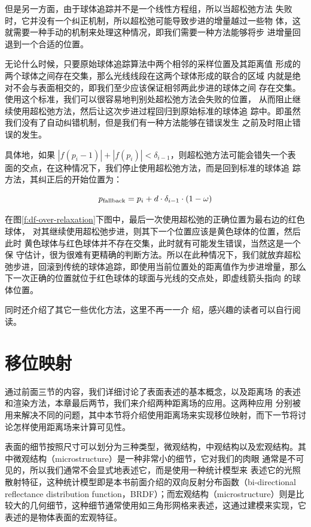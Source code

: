 但是另一方面，由于球体追踪并不是一个线性方程组，所以当超松弛方法 失败时，它并没有一个纠正机制，所以超松弛可能导致步进的增量越过一些物 体，这就需要一种手动的机制来处理这种情况，即我们需要一种方法能够将步 进增量回退到一个合适的位置。

无论什么时候，只要原始球体追踪算法中两个相邻的采样位置及其距离值 形成的两个球体之间存在交集，那么光线线段在这两个球体形成的联合的区域 内就是绝对不会与表面相交的，即我们至少应该保证相邻两此步进的球体之间 存在交集。使用这个标准，我们可以很容易地判别处超松弛方法会失败的位置， 从而阻止继续使用超松弛方法，然后让这次步进过程回归到原始标准的球体追 踪中。即虽然我们没有了自动纠错机制，但是我们有一种方法能够在错误发生 之前及时阻止错误的发生。

具体地，如果 $|f(p_i−1)| + |f(p_i)|< \delta_{i−1}$，则超松弛方法可能会错失一个表 面的交点，在这种情况下，我们停止使用超松弛方法，而是回到标准的球体追 踪方法，其纠正后的开始位置为：

\begin{equation}
	p_{\rm fallback}=p_i+d\cdot \delta_{i-1}\cdot (1-\omega)
\end{equation}

在图\ref{f:df-over-relaxation}下图中，最后一次使用超松弛的正确位置为最右边的红色球体， 对其继续使用超松弛步进，则其下一个位置应该是黄色球体的位置，然后此时 黄色球体与红色球体并不存在交集，此时就有可能发生错误，当然这是一个保 守估计，很为很难有更精确的判断方法。所以在此种情况下，我们就放弃超松 弛步进，回滚到传统的球体追踪，即使用当前位置处的距离值作为步进增量，那么下一次正确的位置就位于红色球体的球面与光线的交点处，即虚线箭头指向 的球体位置。

\cite{a:Enhanced-Sphere-Tracing}同时还介绍了其它一些优化方法，这里不再一一介 绍，感兴趣的读者可以自行阅读。




\section{移位映射}
通过前面三节的内容，我们详细讨论了表面表述的基本概念，以及距离场 的表述和渲染方法，本章最后两节，我们来介绍两种距离场的应用。这两种应用 分别被用来解决不同的问题，其中本节将介绍使用距离场来实现移位映射，而下一节将讨论怎样使用距离场来计算可见性。

表面的细节按照尺寸可以划分为三种类型，微观结构，中观结构以及宏观结构。其中微观结构（microstructure）是一种非常小的细节，它对我们的肉眼 通常是不可见的，所以我们通常不会显式地表述它，而是使用一种统计模型来 表述它的光照散射特征，这种统计模型即是本书前面介绍的双向反射分布函数（bi-directional reflectance distribution function，BRDF）；而宏观结构（microstructure）则是比较大的几何细节，这种细节通常使用如三角形网格来表述，这通过建模来实现，它表述的是物体表面的宏观特征。

